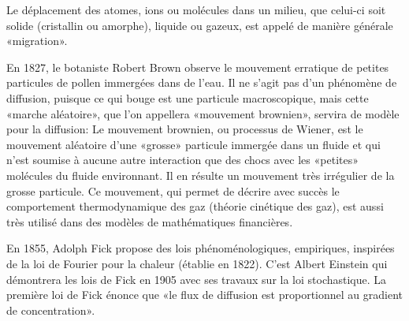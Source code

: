 \medskip
\begin{histoire}%
Le déplacement des atomes, ions ou molécules dans un milieu, que celui-ci soit solide (cristallin ou amorphe), liquide ou gazeux, est appelé de manière générale «migration». 

\medskip
{}

\medskip
En 1827, le botaniste Robert Brown observe le mouvement erratique de petites particules de pollen immergées dans de l'eau. Il ne s'agit pas d'un phénomène de diffusion, puisque ce qui bouge est une particule macroscopique, mais cette «marche aléatoire», que l'on appellera «mouvement brownien», servira de modèle pour la diffusion: Le mouvement brownien, ou processus de Wiener, est le mouvement aléatoire d'une «grosse» particule immergée dans un fluide et qui n'est soumise à aucune autre interaction que des chocs avec les «petites» molécules du fluide environnant.  Il en résulte un mouvement très irrégulier de la grosse particule. Ce mouvement, qui permet de décrire avec succès le comportement thermodynamique des gaz (théorie cinétique des gaz), est aussi très utilisé dans des modèles de mathématiques financières.

\medskip
En 1855, Adolph Fick propose des lois phénoménologiques, empiriques, inspirées de la loi de Fourier pour la chaleur (établie en 1822). C'est Albert Einstein qui démontrera les lois de Fick en 1905 avec ses travaux sur la loi stochastique. La première loi de Fick énonce que «le flux de diffusion est proportionnel au gradient de concentration».
\end{histoire}


